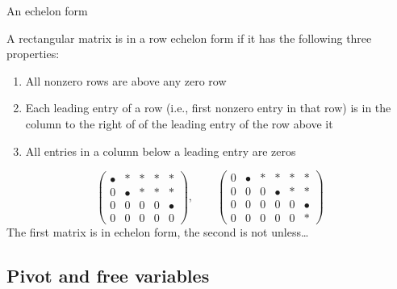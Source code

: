 \documentclass%
[handout]%
{beamer}
\begin{document}

\begin{frame}[label=echelon]{An echelon form}

\vspace*{-5pt}

  \begin{definition}
    A rectangular matrix is in a \alert{row echelon form} if it has the following three properties:
    \begin{enumerate}
      \item All nonzero rows are above any zero row
      \item Each leading entry of a row (i.e., first nonzero entry in that row) is in the column to the right of of the leading entry of the row above it
      \item All entries in a column below a leading entry are zeros
    \end{enumerate}
  \end{definition}

\vspace*{-5pt}

  \begin{example}
  \[
    \begin{pmatrix}
      \bullet & \ast    & \ast  & \ast  & \ast \\
      0       & \bullet & \ast  & \ast  & \ast \\
      0       &     0   &   0   &   0   & \bullet \\
      0       &     0   &   0   &   0   & 0
    \end{pmatrix},
    \qquad
    \begin{pmatrix}
      0       &   \bullet & \ast  & \ast    & \ast  & \ast\\
      0       &   0     & 0     & \bullet   & \ast  & \ast   \\
      0       &     0   &   0   &   0       & 0     & \bullet\\
      0       &     0   &   0   &   0       & 0     &  \ast
    \end{pmatrix}
  \]
  The first matrix is in echelon form, the second is not unless\dots
  \end{example}

\end{frame}

\subsection{Pivot and free variables}
\end{document}
